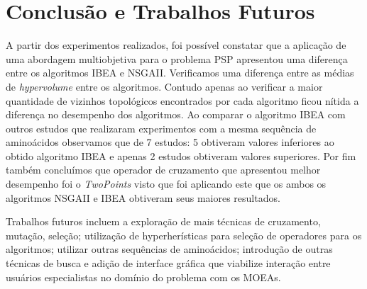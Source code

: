 \documentclass[conference]{IEEEtran}
\begin{document}
\section{Conclusão e Trabalhos Futuros}

A partir dos experimentos realizados, foi possível constatar
que a aplicação de uma abordagem multiobjetiva para o problema PSP apresentou uma diferença entre os algoritmos IBEA e NSGAII. Verificamos uma diferença entre as médias de \textit{hypervolume} entre os algoritmos. Contudo apenas ao verificar a maior quantidade de vizinhos topológicos encontrados por cada algoritmo ficou nítida a diferença no desempenho dos algoritmos. Ao comparar o algoritmo IBEA com outros estudos que realizaram experimentos com a mesma sequência de aminoácidos observamos que de 7 estudos: 5 obtiveram valores inferiores ao obtido algoritmo IBEA e apenas 2 estudos obtiveram valores superiores. Por fim também concluímos que operador de cruzamento que apresentou melhor desempenho foi o \textit{TwoPoints} visto que foi aplicando este que os ambos os algoritmos NSGAII e IBEA obtiveram seus maiores resultados. 

Trabalhos futuros incluem a exploração de mais técnicas de cruzamento, mutação, seleção; utilização de hyperherísticas para seleção de operadores para os algoritmos; utilizar  outras sequências de aminoácidos;  introdução de outras técnicas de busca e adição de interface gráfica que viabilize interação entre usuários especialistas no domínio do problema com os MOEAs. 







%
%
%









\end{document}
